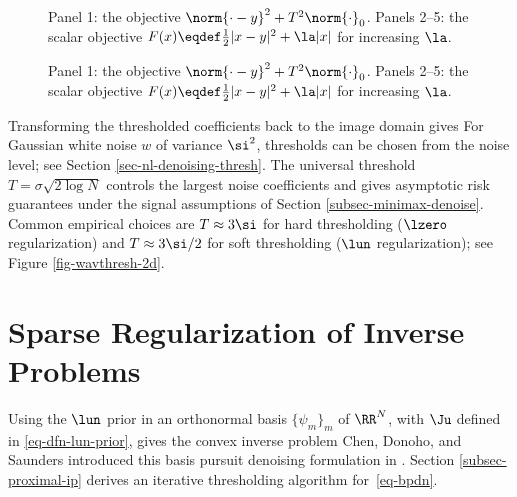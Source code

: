 \begin{figure}[tbp]
\centering
{}\hfill
{}
\caption{Panel 1: the objective $\norm{\cdot-y}^2+T^2 \norm{\cdot}_0$.
    Panels 2--5: the scalar objective $F(x) \eqdef \frac{1}{2}|x-y|^2+\la |x|$ for increasing $\la$.}
\label{fig-varspars}
\end{figure}
\begin{figure}[tbp]
\BookContinuedFigure
\centering
{}\hfill
{}\hfill
{}
\caption{Panel 1: the objective $\norm{\cdot-y}^2+T^2 \norm{\cdot}_0$.
    Panels 2--5: the scalar objective $F(x) \eqdef \frac{1}{2}|x-y|^2+\la |x|$ for increasing $\la$.}
\label{fig-varspars-continued}
\end{figure}




Transforming the thresholded coefficients back to the image domain gives
For Gaussian white noise $w$ of variance $\si^2$, thresholds can be chosen from the noise level; see Section \ref{sec-nl-denoising-thresh}. The universal threshold $T=\sigma\sqrt{2\log N}$ controls the largest noise coefficients and gives asymptotic risk guarantees under the signal assumptions of Section \ref{subsec-minimax-denoise}. Common empirical choices are $T \approx 3\si$ for hard thresholding ($\lzero$ regularization) and $T \approx 3\si/2$ for soft thresholding ($\lun$ regularization); see Figure \ref{fig-wavthresh-2d}.



                                                                                  


                                                                
                                                                
                                                                
\section{Sparse Regularization of Inverse Problems}
\label{sec-sparse-ip}

Using the $\lun$ prior in an orthonormal basis $\{\psi_m\}_m$ of $\RR^N$, with $\Ju$ defined in \eqref{eq-dfn-lun-prior}, gives the convex inverse problem
Chen, Donoho, and Saunders introduced this basis pursuit denoising formulation in \cite{chen-basis-pursuit}. Section \ref{subsec-proximal-ip} derives an iterative thresholding algorithm for~\eqref{eq-bpdn}.

   
\paragr